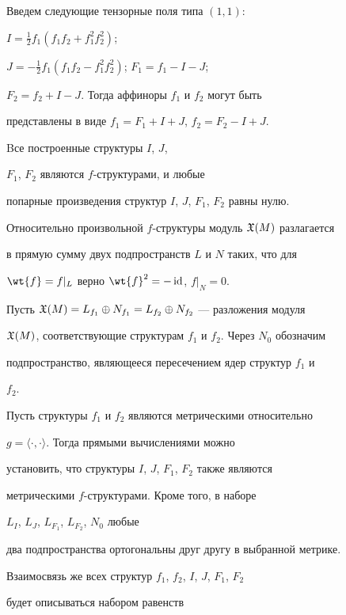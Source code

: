 Введем следующие тензорные поля типа $(1,1)$:


$I=\frac{1}{2}f_1(f_1f_2+f_1^2f_2^2)$;


$J=-\frac{1}{2}f_1(f_1f_2-f_1^2f_2^2)$; $F_1=f_1-I-J$;


$F_2=f_2+I-J$. Тогда аффиноры $f_1$ и $f_2$ могут быть


представлены в виде $f_1=F_1+I+J$, $f_2=F_2-I+J$.


Bсе построенные структуры $I$, $J$,


$F_1$, $F_2$ являются $f$-структурами, и любые


попарные произведения структур $I$, $J$, $F_1$, $F_2$ равны нулю.





Относительно произвольной $f$-структуры модуль $\frak{X}(M)$ разлагается


в прямую сумму двух подпространств $L$ и $N$ таких, что для


$\wt{f}=f|_L$ верно $\wt{f}^2=-\id$, $f|_N=0$.


Пусть $\frak{X}(M)=L_{f_1}\oplus


N_{f_1}=L_{f_2}\oplus N_{f_2}$ --- разложения модуля


$\frak X(M)$, соответствующие структурам $f_1$ и $f_2$. Через $N_0$ обозначим


подпространство, являющееся пересечением ядер структур $f_1$ и


$f_2$.





Пусть структуры $f_1$ и $f_2$ являются метрическими относительно


$g=\langle\cdot,\cdot\rangle$. Тогда прямыми вычислениями можно


установить, что структуры $I$, $J$, $F_1$, $F_2$ также являются


метрическими $f$-структурами. Кроме того, в наборе


$L_I$, $L_J$, $L_{F_1}$, $L_{F_2}$, $N_0$ любые


два подпространства ортогональны друг другу в выбранной метрике.





Взаимосвязь же всех структур $f_1$, $f_2$, $I$, $J$, $F_1$, $F_2$


будет описываться набором равенств


